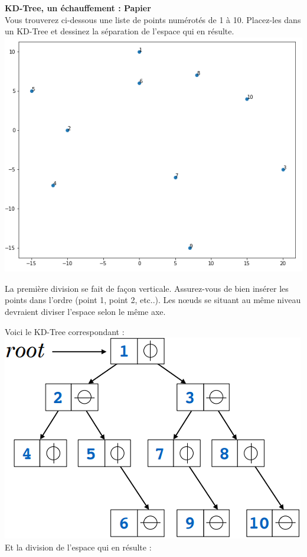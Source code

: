 \begin{Exercice}[5 minutes]\textbf{KD-Tree, un échauffement : Papier}\\
Vous trouverez ci-dessous une liste de points numérotés de 1 à 10. Placez-les dans un KD-Tree et dessinez la séparation de l'espace qui en résulte.\\

\includegraphics[]{KD_points.PNG}

\begin{conseil}
La première division se fait de façon verticale. Assurez-vous de bien insérer les points dans l'ordre (point 1, point 2, etc..). Les nœuds se situant au même niveau devraient diviser l'espace selon le même axe.
\end{conseil}
\begin{solution}
    Voici le KD-Tree correspondant :\\
    \includegraphics[]{Kd-tree.PNG}\\
    Et la division de l'espace qui en résulte :\\


\end{solution}
\end{Exercice}
